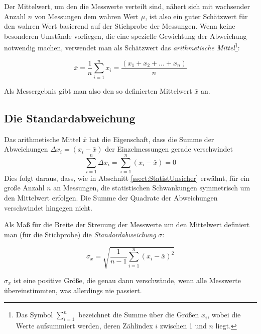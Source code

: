 Der Mittelwert, um den die Messwerte verteilt sind, nähert sich mit wachsender Anzahl $n$ von Messungen dem wahren Wert $\mu$, ist also ein guter Schätzwert für den wahren Wert basierend auf der Stichprobe der Messungen. Wenn keine besonderen Umstände vorliegen, die eine spezielle Gewichtung der Abweichung notwendig machen, verwendet man als Schätzwert das \textit{arithmetische Mittel}\footnote{Das Symbol $\sum_{i=1}^n$ bezeichnet die Summe über die Größen $x_i$, wobei die Werte aufsummiert werden, deren Zählindex $i$ zwischen 1 und $n$ liegt.}:
\begin{hint}
	\begin{equation}
		\bar{x} = \frac{1}{n}\sum^n_{i=1} x_i = \frac{\left(x_1 + x_2 + ... + x_n\right)}{n} 
	\end{equation}
\end{hint}

Als Messergebnis gibt man also den so definierten Mittelwert $\bar{x}$ an.

\subsection{Die Standardabweichung} \label{chap:Standardabweichung}

Das arithmetische Mittel $\bar{x}$ hat die Eigenschaft, dass die Summe der Abweichungen $\Delta x_i = \left( x_i - \bar{x}\right)$ der Einzelmessungen gerade verschwindet
\begin{equation}
	\sum^n_{i=1} \Delta x_i = \sum^n_{i=1} \left(x_i - \bar{x}\right) = 0
\end{equation}
Dies folgt daraus, dass, wie in Abschnitt \ref{ssect:StatistUnsicher} erwähnt, für ein große Anzahl $n$ an Messungen, die statistischen Schwankungen symmetrisch um den Mittelwert erfolgen. Die Summe der Quadrate der Abweichungen verschwindet hingegen nicht.

Als Maß für die Breite der Streuung der Messwerte um den Mittelwert definiert man (für die Stichprobe) die \textit{Standardabweichung} $\sigma$:
\begin{hint}
	\begin{equation}
		\sigma_x = \sqrt{\frac{1}{n-1}\sum^n_{i=1}\left(x_i - \bar{x}\right)^2}
	\end{equation}
\end{hint}

$\sigma_x$ ist eine positive Größe, die genau dann verschwände, wenn alle Messwerte übereinstimmten, was allerdings nie passiert. 

